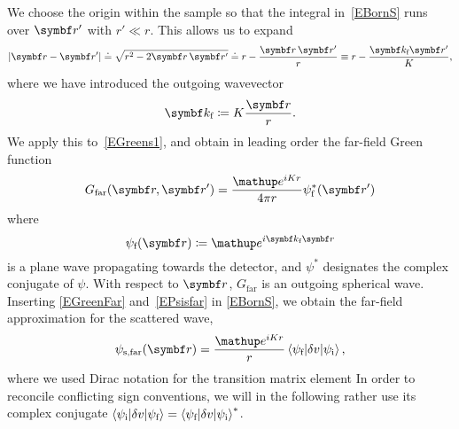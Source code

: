 We choose the origin within the sample
so that the integral in~\cref{EBornS} runs over $\r'$ with $r'\ll r$.
This allows us to expand
\begin{equation}
  \left|\r-\r'\right|
  \doteq \sqrt{r^2-2\r\,\r'}
  \doteq r - \frac{\r\,\r'}{r}
  \equiv r - \frac{\k_\tf \r'}{K},
\end{equation}
%
%
where we have introduced the outgoing wavevector
\begin{equation}
  \k_\tf\coloneqq K\frac{\r}{r}.
\end{equation}
We apply this to~\cref{EGreens1},
%
and obtain in leading order the far-field Green function
\begin{equation}\label{EGreenFar}
  G_\text{far}(\r,\r')
  = \frac{\e^{iKr}}{4\pi r}\psi^*_\tf(\r')
\end{equation}
%
where
\begin{equation}\label{EPsisfar}
  \psi_\tf(\r) \coloneqq  \e^{i\k_\tf \r}
\end{equation}
%
is a plane wave propagating towards the detector,
and $\psi^*$ designates the complex conjugate of $\psi$.
With respect to $\r$, $G_\text{far}$ is an outgoing spherical wave.
Inserting \cref{EGreenFar} and~\cref{EPsisfar} in \cref{EBornS},
we obtain the far-field approximation for the scattered wave,
\begin{equation}\label{EsandwichC}
  \psi_\text{s,far}(\r)
  = \frac{\e^{iKr}}{r}
    \bra \psi_\tf|\delta v|\psi_\ti\ket,
\end{equation}
%
where we used Dirac notation for the transition matrix element
%
%
In order to reconcile conflicting sign conventions,
%
we will in the following rather use its complex conjugate
$\left\langle \psi_{\text{i}}|\delta v|\psi_{\text{f}}\right\rangle = \left\langle \psi_{\text{f}}|\delta v|\psi_{\text{i}}\right\rangle^*$.

